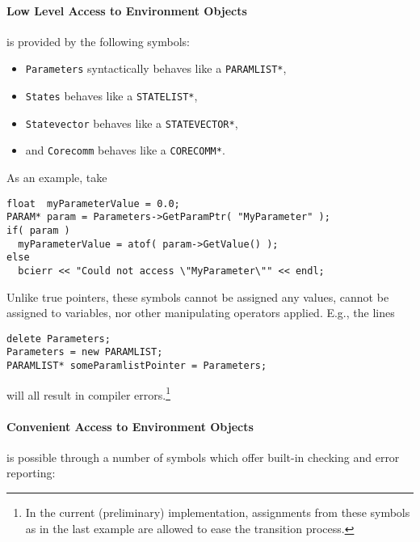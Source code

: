 \documentclass[12pt,a4paper]{article}
\begin{document}
\paragraph{Low Level Access to Environment Objects}
is provided by the following symbols:

\begin{itemize}
\item \texttt{Parameters} syntactically behaves like a \texttt{PARAMLIST*},
\item \texttt{States} behaves like a \texttt{STATELIST*},
\item \texttt{Statevector} behaves like a \texttt{STATEVECTOR*},
\item and \texttt{Corecomm} behaves like a \texttt{CORECOMM*}.
\end{itemize}
As an example, take
\begin{verbatim}
float  myParameterValue = 0.0;
PARAM* param = Parameters->GetParamPtr( "MyParameter" );
if( param )
  myParameterValue = atof( param->GetValue() );
else
  bcierr << "Could not access \"MyParameter\"" << endl;
\end{verbatim}
Unlike true pointers, these symbols cannot be assigned any values,
cannot be assigned to variables, nor other manipulating operators applied.
E.g., the lines
\begin{verbatim}
delete Parameters;
Parameters = new PARAMLIST;
PARAMLIST* someParamlistPointer = Parameters;
\end{verbatim}
will all result in compiler errors.\footnote{In the current (preliminary)
implementation, assignments from these symbols as in the last example are
allowed to ease the transition process.}

\paragraph{Convenient Access to Environment Objects}
is possible through a number of symbols which offer 
built-in checking and error reporting:
\end{document}

